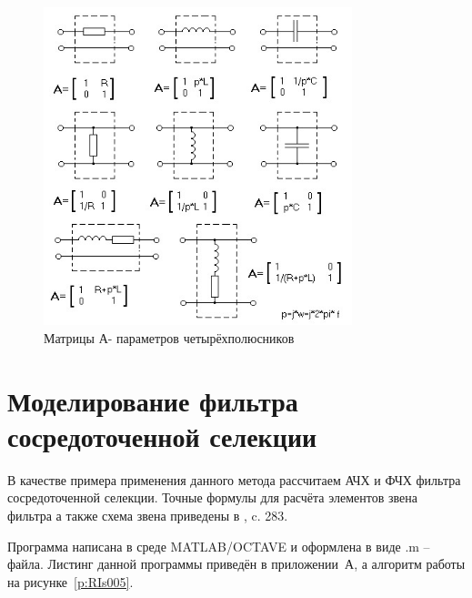 \begin{figure}[H] \centering
  \includegraphics[width=0.8\textwidth]{./content/RIs004.jpg}
  \caption{Матрицы А- параметров четырёхполюсников} \label{p:RIs004}
\end{figure}










\section{Моделирование фильтра сосредоточенной селекции}


В  качестве  примера  применения  данного  метода  рассчитаем  АЧХ  и ФЧХ  фильтра  сосредоточенной  селекции.  Точные  формулы  для  расчёта элементов звена фильтра а также схема звена приведены в \cite{Sivers}, c. 283.  

Программа написана в среде MATLAB/OCTAVE  и оформлена в виде .m –файла.  Листинг  данной  программы  приведён  в  приложении~А,  а  алгоритм работы на рисунке~\ref{p:RIs005}. 



